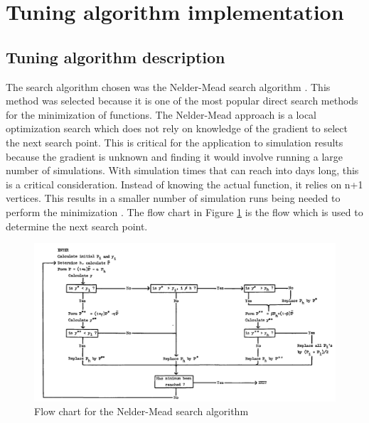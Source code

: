 \documentclass[pdflatex,sn-mathphys]{sn-jnl}
\begin{document}
\section{Tuning algorithm implementation}
	
	\subsection{Tuning algorithm description}
	\label{algrothim_description}

	The search algorithm chosen was the Nelder-Mead search algorithm \cite{nelder_1965}.  This method was selected because it is one of the most popular direct search methods for the minimization of functions.  The Nelder-Mead approach is a local optimization search which does not rely on knowledge of the gradient to select the next search point.  This is critical for the application to simulation results because the gradient is unknown and finding it would involve running a large number of simulations.  With simulation times that can reach into days long, this is a critical consideration.  
	Instead of knowing the actual function, it relies on n+1 vertices.  This results in a smaller number of simulation runs being needed to perform the minimization \cite{wang_2011}.
	The flow chart in Figure \ref{fig:nm_flow} is the flow which is used to determine the next search point.
	\begin{figure}[!htb]
		\centering
		\includegraphics[width=\textwidth]{nm_flow}
		\caption{Flow chart for the Nelder-Mead search algorithm\cite{nelder_1965}}
		\label{fig:nm_flow}
	\end{figure}
	
\end{document}
